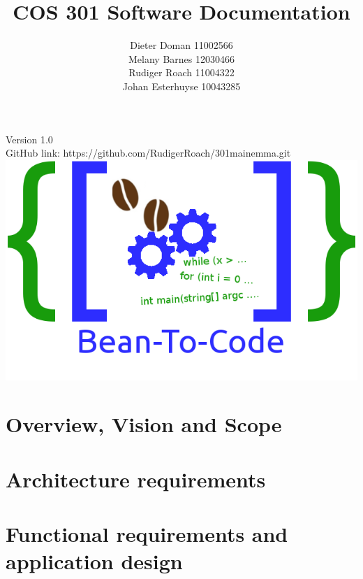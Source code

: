 \documentclass[10pt,a4paper]{article}
\title{COS 301 Software Documentation}
\author{Dieter Doman 11002566 \\
		Melany Barnes 12030466 \\
		Rudiger Roach 11004322 \\
		Johan Esterhuyse 10043285}
\date{}
\begin{document}
\maketitle
\begin{center}
Version 1.0 \\
GitHub link: https://github.com/RudigerRoach/301\textunderscore main\textunderscore emma.git \\
\vspace*{5\baselineskip}
\includegraphics[scale=0.5]{Pictures/Logo.png}
\end{center}
\pagebreak
\tableofcontents
\pagebreak
\section{Overview, Vision and Scope}
\section{Architecture requirements}
\section{Functional requirements and application design}
\end{document}
